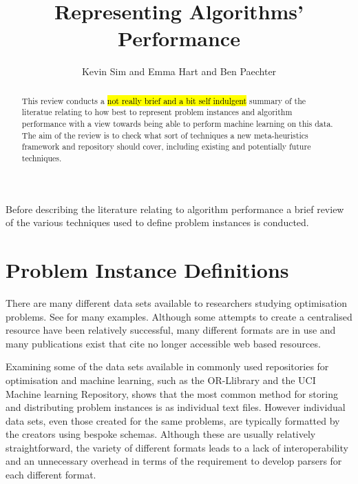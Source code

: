 \documentclass[a4paper]{article}
\title{Representing Algorithms' Performance}
\author{Kevin Sim and Emma Hart and Ben Paechter}
\begin{document}
\maketitle

\begin{abstract}
This review conducts a \hl{not really brief and a bit self indulgent} summary of the literatue relating to how best to represent problem instances and algorithm performance with a view towards being able to perform machine learning on this data. The aim of the review is to check what sort of techniques a new meta-heuristics framework and repository should cover, including existing and potentially future techniques. 

\end{abstract}





Before describing the literature relating to algorithm performance a brief review of the various techniques used to define problem instances is conducted.

\section {Problem Instance Definitions}

There are many different data sets available to researchers studying optimisation problems. See \cite{floudas2013handbook} for many examples. Although some attempts to create a centralised resource have been relatively successful, many different formats are in use and many publications exist that cite no longer accessible web based resources.

Examining some of the data sets available in commonly used repositories for optimisation and machine learning, such as the OR-Llibrary \citep{OR1990} and the UCI Machine learning Repository, shows that the most common method for storing and distributing problem instances is as individual text files.
However individual data sets, even those created for the same problems, are typically formatted by the creators using bespoke schemas.
Although these are usually relatively straightforward, the variety of different formats leads to a lack of interoperability and an unnecessary overhead in terms of the requirement to develop parsers for each different format.
\end{document}
